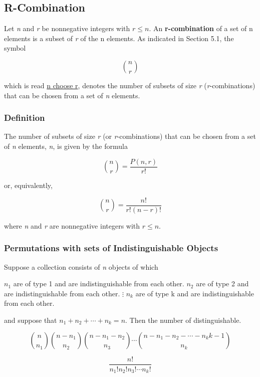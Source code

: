 \documentclass{article}
\begin{document}
\setcounter{section}{9}
\setcounter{subsection}{4}

\subsection{R-Combination}
Let \textit{n} and \textit{r} be nonnegative integers with $r \leq n$. An \textbf{r-combination} of a set of n elements is a subset of \textit{r} of the n elements. As indicated in Section 5.1, the symbol

\[
{{n}\choose{r}}
\]

which is read \underline{n choose r}, denotes the number of subsets of size \textit{r} (\textit{r}-combinations) that can be chosen from a set of \textit{n} elements.

\subsubsection{Definition}
The number of subsets of size \textit{r} (or \textit{r}-combinations) that can be chosen from a set of \textit{n} elements,  \textit{n}, is given by the formula

\[
{{n}\choose{r}}
 = \frac{P(n, r)}{r!}\]

or, equivalently,

\[
{{n}\choose{r}}
 = \frac{n!}{r!(n - r)!}\]

where \textit{n} and \textit{r} are nonnegative integers with $r \leq n$.

\subsubsection{Permutations with sets of Indistinguishable Objects}
Suppose a collection consists of \textit{n} objects of which

\begin{center}
$n_1$ are of type 1 and are indistinguishable from each other.
$n_2$ are of type 2 and are indistinguishable from each other.
$\vdots$
$n_k$ are of type k and are indistinguishable from each other.
\end{center}

and suppose that $n_1 + n_2 + \cdots + n_k = n$. Then the number of distinguishable.

\[
{{n}\choose{n_1}}{{n - n_1}\choose{n_2}}{{n - n_1 - n_2}\choose{n_3}}\cdots{{n - n_1 - n_2 - \cdots - n_k{k - 1}}\choose{n_k}}
\]

\begin{equation}
\frac{n!}{n_1!n_2!n_3! \cdots n_k!}
\end{equation}
\end{document}
